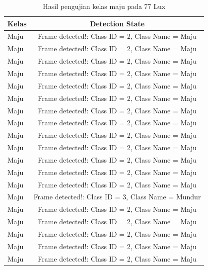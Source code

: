 \begin{longtable}{|l|c|}
  \caption{Hasil pengujian kelas maju pada 77 Lux}
  \label{tb:lux77maju} \\
  \hline
  \rowcolor[HTML]{C0C0C0} 
  \textbf{Kelas} & \textbf{Detection State}                           \\ \hline
  Maju           & Frame detected!: Class ID = 2, Class Name = Maju   \\ \hline
  Maju           & Frame detected!: Class ID = 2, Class Name = Maju   \\ \hline
  Maju           & Frame detected!: Class ID = 2, Class Name = Maju   \\ \hline
  Maju           & Frame detected!: Class ID = 2, Class Name = Maju   \\ \hline
  Maju           & Frame detected!: Class ID = 2, Class Name = Maju   \\ \hline
  Maju           & Frame detected!: Class ID = 2, Class Name = Maju   \\ \hline
  Maju           & Frame detected!: Class ID = 2, Class Name = Maju   \\ \hline
  Maju           & Frame detected!: Class ID = 2, Class Name = Maju   \\ \hline
  Maju           & Frame detected!: Class ID = 2, Class Name = Maju   \\ \hline
  Maju           & Frame detected!: Class ID = 2, Class Name = Maju   \\ \hline
  Maju           & Frame detected!: Class ID = 2, Class Name = Maju   \\ \hline
  Maju           & Frame detected!: Class ID = 2, Class Name = Maju   \\ \hline
  Maju           & Frame detected!: Class ID = 2, Class Name = Maju   \\ \hline
  Maju           & Frame detected!: Class ID = 3, Class Name = Mundur \\ \hline
  Maju           & Frame detected!: Class ID = 2, Class Name = Maju   \\ \hline
  Maju           & Frame detected!: Class ID = 2, Class Name = Maju   \\ \hline
  Maju           & Frame detected!: Class ID = 2, Class Name = Maju   \\ \hline
  Maju           & Frame detected!: Class ID = 2, Class Name = Maju   \\ \hline
  Maju           & Frame detected!: Class ID = 2, Class Name = Maju   \\ \hline

\end{longtable}
